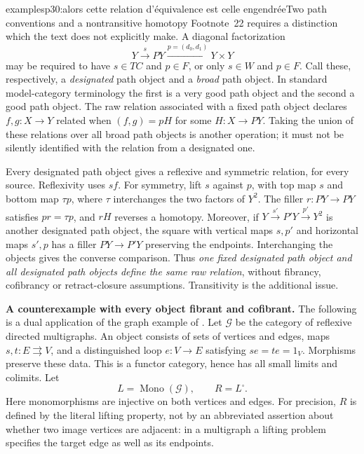 \begin{dcomment}{examples}{p30:alors cette relation d'équivalence est celle engendrée}{Two path conventions and a nontransitive homotopy}
Footnote~22 requires a distinction which the text does not explicitly make. A diagonal factorization
\[
 Y\xrightarrow{s}PY\xrightarrow{p=(d_0,d_1)}Y\times Y
\]
may be required to have $s\in TC$ and $p\in F$, or only $s\in W$ and $p\in F$. Call these, respectively, a \emph{designated} path object and a \emph{broad} path object. In standard model-category terminology the first is a very good path object and the second a good path object. The raw relation associated with a fixed path object declares $f,g:X\to Y$ related when $(f,g)=pH$ for some $H:X\to PY$. Taking the union of these relations over all broad path objects is another operation; it must not be silently identified with the relation from a designated one.

Every designated path object gives a reflexive and symmetric relation, for every source. Reflexivity uses $sf$. For symmetry, lift $s$ against $p$, with top map $s$ and bottom map $\tau p$, where $\tau$ interchanges the two factors of $Y^2$. The filler $r:PY\to PY$ satisfies $pr=\tau p$, and $rH$ reverses a homotopy. Moreover, if $Y\xrightarrow{s'}P'Y\xrightarrow{p'}Y^2$ is another designated path object, the square with vertical maps $s,p'$ and horizontal maps $s',p$ has a filler $PY\to P'Y$ preserving the endpoints. Interchanging the objects gives the converse comparison. Thus \emph{one fixed designated path object and all designated path objects define the same raw relation}, without fibrancy, cofibrancy or retract-closure assumptions. Transitivity is the additional issue.

\noindent\textbf{A counterexample with every object fibrant and cofibrant.}
The following is a dual application of the graph example of \citet[Definition~3.1, Observation~3.3 and Example~3.6]{KurzRosicky2005}. Let $\mathcal G$ be the category of reflexive directed multigraphs. An object consists of sets of vertices and edges, maps $s,t:E\rightrightarrows V$, and a distinguished loop $e:V\to E$ satisfying $se=te=1_V$. Morphisms preserve these data. This is a functor category, hence has all small limits and colimits. Let
\[
 L=\operatorname{Mono}(\mathcal G),\qquad R=L^{\square}.
\]
Here monomorphisms are injective on both vertices and edges. For precision, $R$ is defined by the literal lifting property, not by an abbreviated assertion about whether two image vertices are adjacent: in a multigraph a lifting problem specifies the target edge as well as its endpoints.


\end{dcomment}
